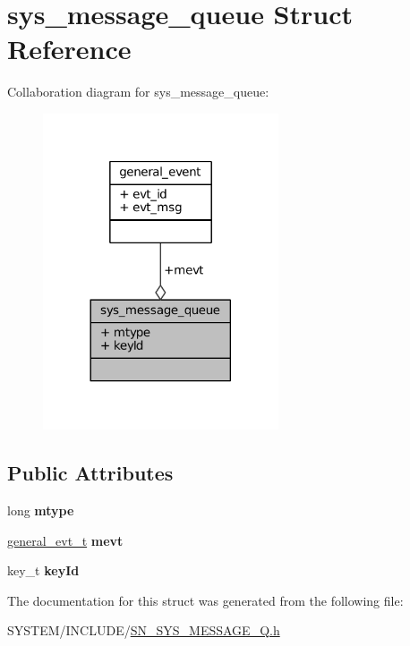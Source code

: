 \hypertarget{structsys__message__queue}{}\section{sys\+\_\+message\+\_\+queue Struct Reference}
\label{structsys__message__queue}


Collaboration diagram for sys\+\_\+message\+\_\+queue\+:\nopagebreak
\begin{figure}[H]
\begin{center}
\leavevmode
\includegraphics[width=197pt]{structsys__message__queue__coll__graph}
\end{center}
\end{figure}
\subsection*{Public Attributes}
\begin{DoxyCompactItemize}
\item 
\mbox{\label{structsys__message__queue_a9b2539ad04839983cc871b10adee6c35}} 
long {\bfseries mtype}
\item 
\mbox{\label{structsys__message__queue_a7da65ae9727739292cc25855477d6b4e}} 
\hyperlink{structgeneral__event}{general\+\_\+evt\+\_\+t} {\bfseries mevt}
\item 
\mbox{\label{structsys__message__queue_ac6b6479c4b7f7610cb17b3288ce2761b}} 
key\+\_\+t {\bfseries key\+Id}
\end{DoxyCompactItemize}


The documentation for this struct was generated from the following file\+:\begin{DoxyCompactItemize}
\item 
S\+Y\+S\+T\+E\+M/\+I\+N\+C\+L\+U\+D\+E/\hyperlink{SN__SYS__MESSAGE__Q_8h}{S\+N\+\_\+\+S\+Y\+S\+\_\+\+M\+E\+S\+S\+A\+G\+E\+\_\+\+Q.\+h}\end{DoxyCompactItemize}
